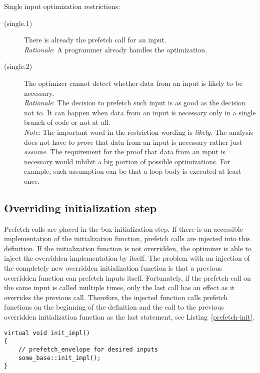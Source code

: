\pagebreak[4]
Single input optimization restrictions:

\begin{description}
\item[(single.1)]{There is already the prefetch call for an input.\\
\emph{Rationale}: A programmer already handles the optimization.
}

\item[(single.2)]{The optimizer cannot detect whether data from an input is likely to be necessary.\\
\emph{Rationale}: The decision to prefetch such input is as good as the decision not to. It can happen when data from an input is necessary only in a single branch of code or not at all.\\
\emph{Note}: The important word in the restriction wording is \emph{likely}. The analysis does not have to \emph{prove} that data from an input is necessary rather just \emph{assume}. The requirement for the proof that data from an input is necessary would inhibit a big portion of possible optimizations. For example, such assumption can be that a loop body is executed at least once.
}
\end{description}

\subsection{Overriding initialization step}
Prefetch calls are placed in the box initialization step. If there is an accessible implementation of the initialization function, prefetch calls are injected into this definition. If the initialization function is not overridden, the optimizer is able to inject the overridden implementation by itself. The problem with an injection of the completely new overridden initialization function is that a previous overridden function can prefetch inputs itself. Fortunately, if the prefetch call on the same input is called multiple times, only the last call has an effect as it overrides the previous call. Therefore, the injected function calls prefetch functions on the beginning of the definition and the call to the previous overridden initialization function as the last statement, see Listing~\ref{prefetch-init}.

\begin{lstlisting}[caption={The generated box initialization function definition.}, label={prefetch-init}]
virtual void init_impl()
{
    // prefetch_envelope for desired inputs
    some_base::init_impl();
}
\end{lstlisting}

